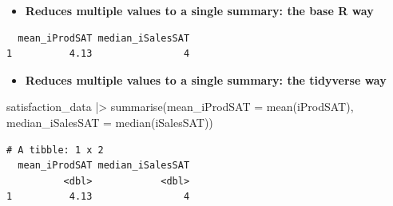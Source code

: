 \documentclass[
  ignorenonframetext,
]{beamer}
\newenvironment{Shaded}{\begin{snugshade}}{\end{snugshade}}
\newcommand{\AttributeTok}[1]{\textcolor[rgb]{0.40,0.45,0.13}{#1}}
\newcommand{\FunctionTok}[1]{\textcolor[rgb]{0.28,0.35,0.67}{#1}}
\newcommand{\NormalTok}[1]{\textcolor[rgb]{0.00,0.23,0.31}{#1}}
\newcommand{\SpecialCharTok}[1]{\textcolor[rgb]{0.37,0.37,0.37}{#1}}
\providecommand{\tightlist}{%
  \setlength{\itemsep}{0pt}\setlength{\parskip}{0pt}}\usepackage{longtable,booktabs,array}
\begin{document}
\begin{frame}[fragile]{}
\label{section-15}
\begin{itemize}
\tightlist
\item
  \textbf{Reduces multiple values to a single summary: the base R way}
\end{itemize}

\tiny

\begin{Shaded}
\end{Shaded}

\begin{verbatim}
  mean_iProdSAT median_iSalesSAT
1          4.13                4
\end{verbatim}

\normalsize

\begin{itemize}
\tightlist
\item
  \textbf{Reduces multiple values to a single summary: the tidyverse
  way}
\end{itemize}

\tiny

\begin{Shaded}
\begin{Highlighting}[]
\NormalTok{satisfaction\_data }\SpecialCharTok{|\textgreater{}}
  \FunctionTok{summarise}\NormalTok{(}\AttributeTok{mean\_iProdSAT =} \FunctionTok{mean}\NormalTok{(iProdSAT), }\AttributeTok{median\_iSalesSAT =} \FunctionTok{median}\NormalTok{(iSalesSAT))}
\end{Highlighting}
\end{Shaded}

\begin{verbatim}
# A tibble: 1 x 2
  mean_iProdSAT median_iSalesSAT
          <dbl>            <dbl>
1          4.13                4
\end{verbatim}
\end{frame}
\end{document}
